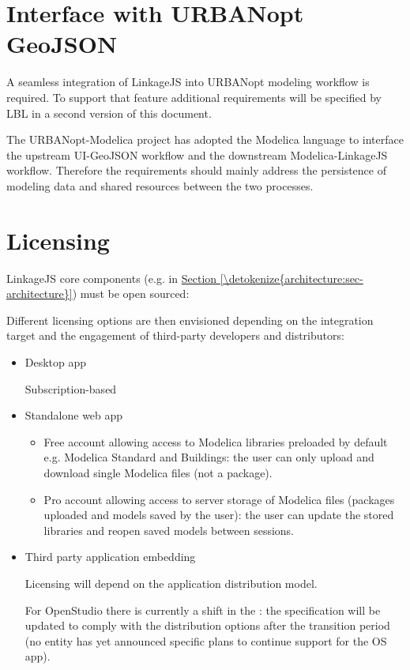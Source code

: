 \documentclass[letterpaper,10pt, openany,english]{sphinxmanual}
\begin{document}
\section{Interface with URBANopt GeoJSON}
\label{\detokenize{requirements:interface-with-urbanopt-geojson}}
A seamless integration of LinkageJS into URBANopt modeling workflow is required. To support that feature additional requirements will be specified by LBL in a second version of this document.

The URBANopt-Modelica project has adopted the Modelica language to interface the upstream UI-GeoJSON workflow and the downstream Modelica-LinkageJS workflow. Therefore the requirements should mainly address the persistence of modeling data and shared resources between the two processes.


\section{Licensing}
\label{\detokenize{requirements:licensing}}
LinkageJS core components (e.g.  in \hyperref[\detokenize{architecture:sec-architecture}]{Section \ref{\detokenize{architecture:sec-architecture}}}) must be open sourced: 

Different licensing options are then envisioned depending on the integration target and the engagement of third-party developers and distributors:
\begin{itemize}
\item {} 
Desktop app

Subscription-based

\item {} 
Standalone web app
\begin{itemize}
\item {} 
Free account allowing access to Modelica libraries preloaded by default e.g. Modelica Standard and Buildings: the user can only upload and download single Modelica files (not a package).

\item {} 
Pro account allowing access to server storage of Modelica files (packages uploaded and models saved by the user): the user can update the stored libraries and reopen saved models between sessions.

\end{itemize}

\item {} 
Third party application embedding

Licensing will depend on the application distribution model.

For OpenStudio there is currently a shift in the : the specification will be updated to comply with the distribution options after the transition period (no entity has yet announced specific plans to continue support for the OS app).

\end{itemize}
\end{document}
